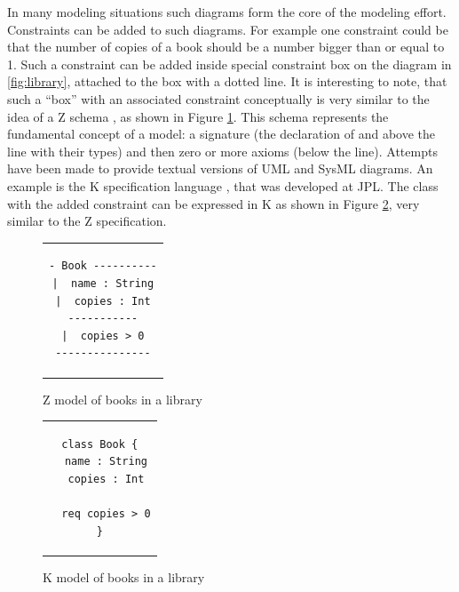 In many modeling situations such diagrams form the core of the modeling effort. Constraints can be added to such diagrams.
For example one constraint could be that the number of copies of a book should be a number bigger than or equal to 1. Such a constraint can be added inside special constraint box on the diagram  in \ref{fig:library}, attached to the  box
with a dotted line. It is interesting to note, that such a ``box''
with an associated constraint conceptually is very similar to the idea of a Z schema \cite{?}, as shown in Figure \ref{fig:book-z}.
This schema represents the fundamental concept of a model: a signature (the declaration of  and  above the line with their types) and then zero or more axioms (below the line). 
%
Attempts have been made to provide textual versions of UML and SysML diagrams. An example is  the K specification language \cite{?}, that was developed at JPL. The  class with the added constraint can be expressed in K as shown in Figure 
\ref{fig:book-k}, very similar
to the Z specification.


\begin{figure}
\begin{center}
\begin{tabular}{c}
\begin{lstlisting}[language=zlang]
- Book ----------
|  name : String
|  copies : Int
-----------
|  copies > 0
---------------
\end{lstlisting}
\end{tabular}
\end{center}
\caption{Z model of books in a library}
\label{fig:book-z}
\end{figure}

\begin{figure}
\begin{center}
\begin{tabular}{c}
\begin{lstlisting}[language=klang]
class Book {
  name : String
  copies : Int
   
  req copies > 0
}
\end{lstlisting}
\end{tabular}
\end{center}
\caption{K model of books in a library}
\label{fig:book-k}
\end{figure}

